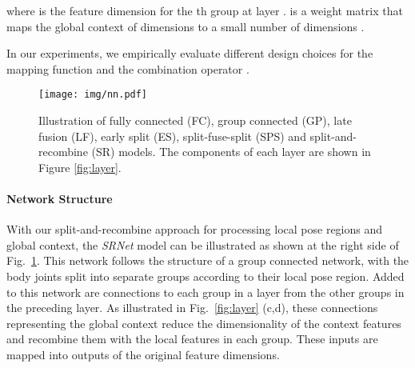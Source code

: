 \documentclass[runningheads]{llncs}
\begin{document}
where  is the feature dimension for the th group at layer .  is a weight matrix that maps the global context  of dimensions  to a small number of dimensions .

In our experiments, we empirically evaluate different design choices for the mapping function  and the combination operator .







\begin{figure}[t]
\begin{center}
\texttt{[image: img/nn.pdf]}
\end{center}
  \caption{Illustration of fully connected (FC), group connected (GP), late fusion (LF), early split (ES), split-fuse-split (SPS) and split-and-recombine (SR) models. The components of each layer are shown in Figure \ref{fig:layer}.}
\label{fig:network}
\end{figure}


\paragraph{\textbf{Network Structure}}
With our split-and-recombine approach for processing local pose regions and global context, the \emph{SRNet} model can be illustrated as shown at the right side of Fig.~\ref{fig:network}. This network follows the structure of a group connected network, with the body joints split into separate groups according to their local pose region. Added to this network are connections to each group in a layer from the other groups in the preceding layer. As illustrated in Fig.~\ref{fig:layer} (c,d), these connections representing the global context reduce the dimensionality of the context features and recombine them with the local features in each group. These inputs are mapped into outputs of the original feature dimensions.
\end{document}
